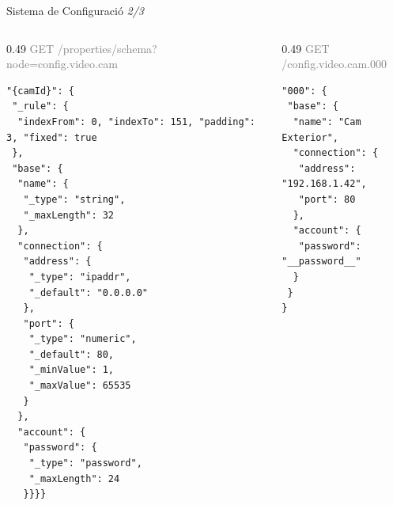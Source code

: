 \begin{frame}[fragile]{Sistema de Configuració \small\textit{2/3}}
  \begin{columns}[T]
    \begin{column}{0.49\textwidth}
      \small\hfill\textcolor{gray}{\tiny GET /properties/schema?node=config.video.cam}
      \vspace{-0.2em}
      \begin{lstlisting}[style=jsonbox]
"{camId}": {
 "_rule": {
  "indexFrom": 0, "indexTo": 151, "padding": 3, "fixed": true
 },
 "base": {
  "name": {
   "_type": "string",
   "_maxLength": 32
  },
  "connection": {
   "address": {
    "_type": "ipaddr",
    "_default": "0.0.0.0"
   },
   "port": {
    "_type": "numeric",
    "_default": 80,
    "_minValue": 1,
    "_maxValue": 65535
   }
  },
  "account": {
   "password": {
    "_type": "password",
    "_maxLength": 24
   }}}}\end{lstlisting}
    \end{column}

    \begin{column}{0.49\textwidth}
      \small\hfill\textcolor{gray}{\tiny GET /config.video.cam.000}
      \vspace{-0.2em}
      \begin{lstlisting}[style=jsonbox]
"000": {
 "base": {
  "name": "Cam Exterior",
  "connection": {
   "address": "192.168.1.42",
   "port": 80
  },
  "account": {
   "password": "__password__"
  }
 }
}\end{lstlisting}

      \vspace{0.6em}
    \end{column}
  \end{columns}
\end{frame}

